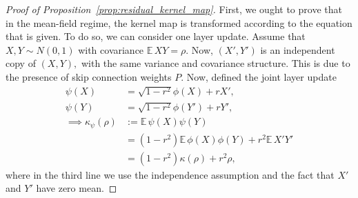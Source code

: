 \documentclass[twoside]{article}
\newcommand{\E}{\mathbb{E}\,}
\theoremstyle{definition}
\begin{document}
\begin{proof}[Proof of Proposition~\ref{prop:residual_kernel_map}]
First, we ought to prove that in the mean-field regime, the kernel map is transformed according to the equation that is given. To do so, we can consider one layer update. Assume that $X,Y\sim N(0,1)$ with covariance $\E XY = \rho.$ Now, $(X',Y')$ is an independent copy of $(X,Y),$ with the same variance and covariance structure. This is due to the presence of skip connection weights $P.$ Now, defined the joint layer update 
\begin{align*}
\psi(X) &= \sqrt{1-r^2} \phi(X)  + r X',\\
\psi(Y) &= \sqrt{1-r^2} \phi(Y')  + r Y',\\
\implies \kappa_\psi(\rho)&:= \E \psi(X)\psi(Y) \\
&=  (1-r^2) \E \phi(X)\phi(Y) + r^2 \E X' Y' \\
    &= (1-r^2) \kappa(\rho) + r^2 \rho,
\end{align*}
where in the third line we use the independence assumption and the fact that $X'$ and $Y'$ have zero mean. 


\end{proof}
\end{document}
